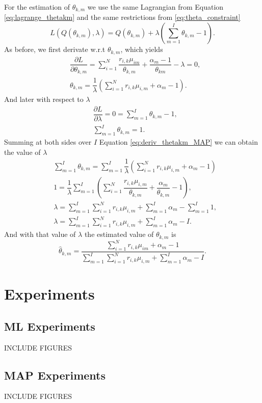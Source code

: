 \documentclass[12pt]{article}
\begin{document}
\noindent For the estimation of $\theta_{k,m}$ we use the same Lagrangian from Equation \ref{eq:lagrange_thetakm} and the same restrictions from \ref{eq:theta_constraint} 
\begin{equation}
L\left( Q(\theta_{k,m}),\lambda \right) = Q(\theta_{k,m}) + \lambda \left( \sum \limits_{m=1}^{I} \theta_{k,m} - 1 \right).
\end{equation}
As before, we first derivate w.r.t $\theta_{k,m}$, which yields
\begin{align}
& \dfrac{\partial L}{\partial \theta_{k,m}} = \sum \limits_{i=1}^{N} \dfrac{r_{i,k}\mu_{im}}{\theta_{k,m}} + \dfrac{\alpha_m-1}{\theta_{km}} - \lambda = 0, \\
& \theta_{k,m} = \dfrac{1}{\lambda} \left( \sum \limits_{i=1}^{N} r_{i,k}\mu_{i,m} +\alpha_m - 1\right) \label{eq:deriv_thetakm_MAP}.
\end{align}
And later with respect to $\lambda$
\begin{align}
& \dfrac{\partial L}{\partial \lambda} = 0 = \sum \limits_{m=1}^{I} \theta_{k,m} - 1,\\
& \sum \limits_{m=1}^{I} \theta_{k,m} = 1.
\end{align}
Summing at both sides over $I$ Equation \ref{eq:deriv_thetakm_MAP} we can obtain the value of $\lambda$
\begin{align}
& \sum \limits_{m=1}^{I}\theta_{k,m} = \sum \limits_{m=1}^{I} \dfrac{1}{\lambda} \left( \sum \limits_{i=1}^{N} r_{i,k}\mu_{i,m} + \alpha_m - 1 \right)\\
& 1 = \dfrac{1}{\lambda} \sum \limits_{m=1}^{I} \left( \sum \limits_{i=1}^{N} \dfrac{r_{i,k}\mu_{i,m}}{\theta_{k,m}} + \dfrac{\alpha_m}{\theta_{k,m}} - 1 \right),\\
& \lambda = \sum \limits_{m=1}^{I} \sum \limits_{i=1}^{N} r_{i,k}\mu_{i,m} + \sum \limits_{m=1}^{I} \alpha_m - \sum \limits_{m=1}^{I} 1,\\
& \lambda = \sum \limits_{m=1}^{I} \sum \limits_{i=1}^{N} r_{i,k}\mu_{i,m} + \sum \limits_{m=1}^{I} \alpha_m - I.
\end{align}
And with that value of $\lambda$ the estimated value of $\theta_{k,m}$ is
\begin{equation}
\hat{\theta}_{k,m} = \dfrac{\sum \limits_{i=1}^{N} r_{i,k}\mu_{im} +\alpha_m - 1}{\sum \limits_{m=1}^{I} \sum \limits_{i=1}^{N} r_{i,k}\mu_{i,m} + \sum \limits_{m=1}^{I} \alpha_m - I}.
\end{equation}

\section{Experiments}

\subsection{ML Experiments}
INCLUDE FIGURES
\subsection{MAP Experiments}
INCLUDE FIGURES
\nocite{*}
\printbibliography
\end{document}
